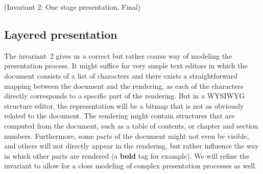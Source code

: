 {\centering (Invariant 2: One stage presentation, Final)\\}\vspace{1em}
\subsection{Layered presentation}


The invariant~2 gives us a correct but rather coarse way of modeling the presentation process. It might suffice for very simple text editors in which the document consists of a list of characters and there exists a straightforward mapping between the document and the rendering, as each of the characters directly corresponds to a specific part of the rendering. But in a WYSIWYG structure editor, the representation will be a bitmap that is not as obviously related to the document. The rendering might contain structures that are computed from the document, such as a table of contents, or chapter and section numbers. Furthermore, some parts of the document might not even be visible, and others will not directly appear in the rendering, but rather influence the way in which other parts are rendered (a {\bf bold} tag for example). We will refine the invariant to allow for a close modeling of complex presentation processes as well.
